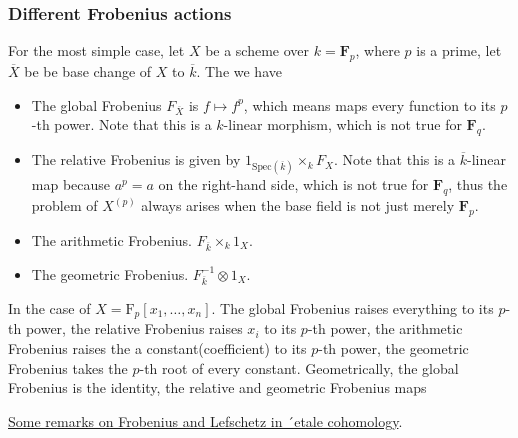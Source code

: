 \documentclass[../main.tex]{subfiles}
\begin{document}
\subsubsection{Different Frobenius actions}
For the most simple case, let $X$ be a scheme over $k=\mathbf{F}_{p}$, where $p$ is a prime, let $\overline{X}$ be be base change of $X$ to $\overline{k}$. The  we have 
\begin{itemize}
    \item The global Frobenius $F_{\overline{X}}$ is $f\mapsto f^{p}$, which means maps every function to its $p$-th power. Note that this is a $k$-linear morphism, which is not true for $\mathbf{F}_{q}$.
    \item The relative Frobenius is given by $1_{\mathrm{Spec}(\overline{k})}\times_{k}F_{X}$. Note that this is a $\overline{k}$-linear map because $a^{p}=a$ on the right-hand side, which is not true for $\mathbf{F}_{q}$, thus the problem of $X^{(p)}$ always arises when the base field is not just merely $\mathbf{F}_{p}$.
    \item The arithmetic Frobenius. $F_{\overline{k}}\times_{k} 1_{X}$.
    \item The geometric Frobenius. $F_{\overline{k}}^{-1}\otimes 1_{X}$.
\end{itemize}
In the case of $X=\mathrm{F}_{p}[x_{1}, \dots, x_{n}]$. The global Frobenius raises everything to its $p$-th power, the relative Frobenius raises $x_{i}$ to its $p$-th power, the arithmetic Frobenius raises the a constant(coefficient) to its $p$-th power, the geometric Frobenius takes the $p$-th root of every constant. Geometrically, the global Frobenius is the identity, the relative and geometric Frobenius maps
\begin{remark}
\href{http://www.math.mcgill.ca/goren/SeminarOnCohomology/Frobenius.pdf}{Some remarks on Frobenius and Lefschetz
in ´etale cohomology}.
\end{remark}
\end{document}
